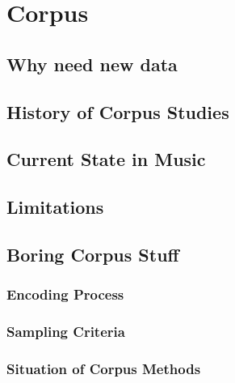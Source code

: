 \documentclass[]{book}
\theoremstyle{definition}
\theoremstyle{definition}
\theoremstyle{definition}
\theoremstyle{remark}
\begin{document}
\hypertarget{corpus}{%
\chapter{Corpus}\label{corpus}}

\hypertarget{why-need-new-data}{%
\section{Why need new data}\label{why-need-new-data}}

\hypertarget{history-of-corpus-studies}{%
\section{History of Corpus Studies}\label{history-of-corpus-studies}}

\hypertarget{current-state-in-music}{%
\section{Current State in Music}\label{current-state-in-music}}

\hypertarget{limitations}{%
\section{Limitations}\label{limitations}}

\hypertarget{boring-corpus-stuff}{%
\section{Boring Corpus Stuff}\label{boring-corpus-stuff}}

\hypertarget{encoding-process}{%
\subsection{Encoding Process}\label{encoding-process}}

\hypertarget{sampling-criteria}{%
\subsection{Sampling Criteria}\label{sampling-criteria}}

\hypertarget{situation-of-corpus-methods}{%
\subsection{Situation of Corpus
Methods}\label{situation-of-corpus-methods}}
\end{document}
